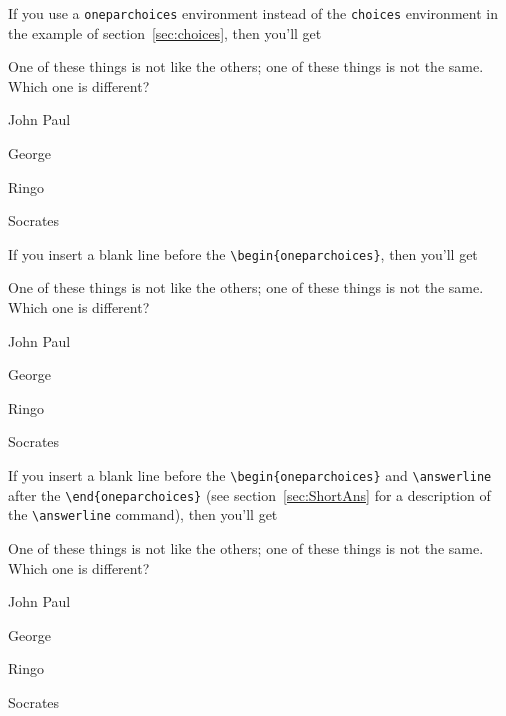\documentclass[12pt]{exam}
\makeatletter
\newcommand{\indc}[1]{\index{#1@\texttt{\char`\\#1}}}
\makeatother
\begin{document}
If you use a \verb"oneparchoices" environment instead of the
\verb"choices" environment in the example of
section~\ref{sec:choices}, then you'll get
\begin{questions}
\question
One of these things is not like the others; one of these things is not
the same.  Which one is different?
\begin{oneparchoices}
\choice John
\choice Paul

\choice

George

\choice Ringo

\choice Socrates

\end{oneparchoices}
    
\end{questions}

If you insert a blank line before the \verb"\begin{oneparchoices}",
  then you'll get
\begin{questions}
\question
One of these things is not like the others; one of these things is not
the same.  Which one is different?

\begin{oneparchoices}
\choice John
\choice Paul

\choice

George

\choice Ringo

\choice Socrates

\end{oneparchoices}
    
\end{questions}


If you insert a blank line before the \verb"\begin{oneparchoices}" and
  \verb"\answerline" after the \verb"\end{oneparchoices}" (see
section~\ref{sec:ShortAns} for a description of the
\verb"\answerline"\indc{answerline} command), then you'll get
\begin{questions}
\question
One of these things is not like the others; one of these things is not
the same.  Which one is different?

\begin{oneparchoices}
\choice John
\choice Paul

\choice

George

\choice Ringo

\choice Socrates

\end{oneparchoices}
\answerline

\end{questions}
\end{document}
